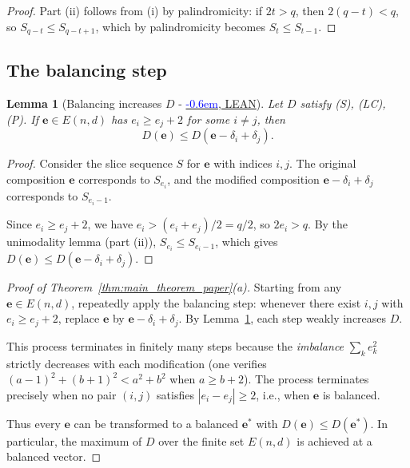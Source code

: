 \documentclass[12pt,reqno]{amsart}
\newtheorem{lemma}[theorem]{Lemma}
\theoremstyle{definition}
\newcommand\doublecheck{\textcolor{blue}{\checked\kern-0.6em\checked}}
\newcommand{\ee}{\mathbf{e}}
\begin{document}
\begin{aiparagraph}
\begin{proof}
Part (ii) follows from (i) by palindromicity: if $2t > q$, then $2(q - t) < q$, so $S_{q-t} \leq S_{q-t+1}$, which by palindromicity becomes $S_t \leq S_{t-1}$.
\end{proof}

\subsection{The balancing step}

\begin{lemma}[Balancing increases $D$ - \href{https://schmittj.github.io/balanced-vectors-blueprint/docs/BalancedVectors.html\#balancing_increases_D}{\doublecheck, LEAN}]\label{lem:balancing_increases_D}
Let $D$ satisfy \textup{(S)}, \textup{(LC)}, \textup{(P)}. If $\ee \in E(n,d)$ has $e_i \geq e_j + 2$ for some $i \neq j$, then
\[
D(\ee) \leq D(\ee - \delta_i + \delta_j).
\]
\end{lemma}

\begin{proof}
Consider the slice sequence $S$ for $\ee$ with indices $i, j$. The original composition $\ee$ corresponds to $S_{e_i}$, and the modified composition $\ee - \delta_i + \delta_j$ corresponds to $S_{e_i - 1}$.

Since $e_i \geq e_j + 2$, we have $e_i > (e_i + e_j)/2 = q/2$, so $2e_i > q$. By the unimodality lemma (part (ii)), $S_{e_i} \leq S_{e_i - 1}$, which gives $D(\ee) \leq D(\ee - \delta_i + \delta_j)$.
\end{proof}

\begin{proof}[Proof of Theorem~\ref{thm:main_theorem_paper}(a)]
Starting from any $\ee \in E(n,d)$, repeatedly apply the balancing step: whenever there exist $i, j$ with $e_i \geq e_j + 2$, replace $\ee$ by $\ee - \delta_i + \delta_j$. By Lemma~\ref{lem:balancing_increases_D}, each step weakly increases $D$.

This process terminates in finitely many steps because the \emph{imbalance} $\sum_k e_k^2$ strictly decreases with each modification (one verifies $(a-1)^2 + (b+1)^2 < a^2 + b^2$ when $a \geq b + 2$). The process terminates precisely when no pair $(i, j)$ satisfies $|e_i - e_j| \geq 2$, i.e., when $\ee$ is balanced.

Thus every $\ee$ can be transformed to a balanced $\ee^*$ with $D(\ee) \leq D(\ee^*)$. In particular, the maximum of $D$ over the finite set $E(n,d)$ is achieved at a balanced vector.
\end{proof}


\end{aiparagraph}
\end{document}
